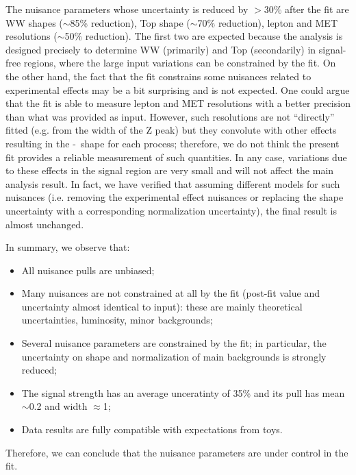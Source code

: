 The nuisance parameters whose uncertainty is reduced by $>$30\% after the fit are WW shapes ($\sim$85\% reduction), Top shape ($\sim$70\% reduction), 
lepton and MET resolutions ($\sim$50\% reduction).
The first two are expected because the analysis is designed precisely to determine WW (primarily) and Top (secondarily) in signal-free regions, 
where the large input variations can be constrained by the fit.
On the other hand, the fact that the fit constrains some nuisances related to experimental effects may be a bit surprising and is not expected.
One could argue that the fit is able to measure lepton and MET resolutions with a better precision than what was provided as input.
However, such resolutions are not “directly” fitted (e.g. from the width of the Z peak) but they convolute with other effects resulting in 
the \mt-\mll\ shape for each process; therefore, we do not think the present fit provides a reliable measurement of such quantities.
In any case, variations due to these effects in the signal region are very small and will not affect the main analysis result.
In fact, we have verified that assuming different models for such nuisances (i.e. removing the experimental effect nuisances or replacing 
the shape uncertainty with a corresponding normalization uncertainty), the final result is almost unchanged.

In summary, we observe that:
\begin{itemize}
\item All nuisance pulls are unbiased;
\item Many nuisances are not constrained at all by the fit (post-fit value and uncertainty almost identical to input): 
these are mainly theoretical uncertainties, luminosity, minor backgrounds;
\item Several nuisance parameters are constrained by the fit; in particular, the uncertainty on shape and normalization of main backgrounds is strongly reduced;
\item The signal strength has an average unceratinty of 35\% and its pull has mean $\sim$0.2 and width $\approx$1;
\item Data results are fully compatible with expectations from toys.
\end{itemize}
Therefore, we can conclude that the nuisance parameters are under control in the fit.
